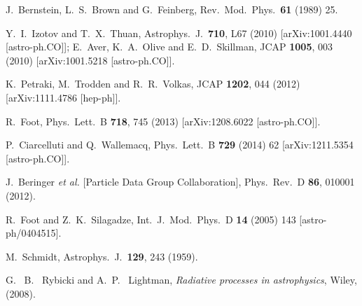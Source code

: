 \documentclass[12pt]{article}
\begin{document}
{{\begin{thebibliography}{999}
  J.~Bernstein, L.~S.~Brown and G.~Feinberg,
  Rev.\ Mod.\ Phys.\  {\bf 61} (1989) 25.
  
  Y.~I.~Izotov and T.~X.~Thuan,
  Astrophys.\ J.\  {\bf 710}, L67 (2010)
  [arXiv:1001.4440 [astro-ph.CO]];
  E.~Aver, K.~A.~Olive and E.~D.~Skillman,
  JCAP {\bf 1005}, 003 (2010)
  [arXiv:1001.5218 [astro-ph.CO]].
  
  K.~Petraki, M.~Trodden and R.~R.~Volkas,
  JCAP {\bf 1202}, 044 (2012)
  [arXiv:1111.4786 [hep-ph]].
  
  R.~Foot,
  Phys.\ Lett.\ B {\bf 718}, 745 (2013)
  [arXiv:1208.6022 [astro-ph.CO]].
 
  P.~Ciarcelluti and Q.~Wallemacq,
  Phys.\ Lett.\ B {\bf 729} (2014) 62
  [arXiv:1211.5354 [astro-ph.CO]].
  
  J.~Beringer {\it et al.}  [Particle Data Group Collaboration],
  Phys.\ Rev.\ D {\bf 86}, 010001 (2012).
  
  R.~Foot and Z.~K.~Silagadze,
  Int.\ J.\ Mod.\ Phys.\ D {\bf 14} (2005) 143
  [astro-ph/0404515].

  M.~Schmidt,
  Astrophys.\ J.\  {\bf 129}, 243 (1959).
  
 
 G. ~B. ~Rybicki and A.~P. ~Lightman,
 {\it Radiative processes in astrophysics},
 Wiley, (2008).
 

\end{thebibliography}}}
\end{document}
